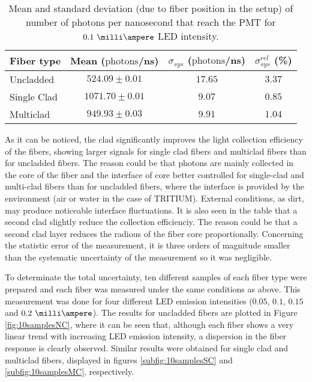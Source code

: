 \begin{table}[htbp]
\centering{}%
\begin{tabular}{lccc}
\toprule 
Fiber type & Mean ($\text{photons}$/ns) & $\sigma_{sys}$ ($\text{photons}$/ns) & $\sigma^{rel}_{sys}$ (\%) \tabularnewline
\midrule
\midrule 
Uncladded & $524.09 \pm 0.01$ & $17.65$ & $3.37$ \tabularnewline
Single Clad & $1071.70 \pm 0.01$ & $9.07$ & $0.85$ \tabularnewline
Multiclad & $949.93 \pm 0.03$ & $9.91$ & $1.04$ \tabularnewline
\bottomrule
\end{tabular}
\caption{Mean and standard deviation (due to fiber position in the setup) of number of photons per nanosecond that reach the PMT for $0.1~\milli\ampere$ LED intensity.}
\label{tab:PositionStandardDeviation}
\end{table}
As it can be noticed, the clad significantly improves the light collection efficiency of the fibers, showing larger signals for single clad fibers and multiclad fibers than for uncladded fibers. The reason could be that photons are mainly collected in the core of the fiber and the interface of core better controlled for single-clad and multi-clad fibers than for uncladded fibers, where the interface is provided by the environment (air or water in the case of TRITIUM). External conditions, as dirt, may produce noticeable interface fluctuations. It is also seen in the table that a second clad slightly reduce the collection efficienciy. The reason could be that a second clad layer reduces the radious of the fiber core proportionally. Concerning the statistic error of the measurement, it is three orders of magnitude smaller than the systematic uncertainty of the measurement so it was negligible.


To determinate the total uncertainty, ten different samples of each fiber type were prepared and each fiber was measured under the same conditions as above. This measurement was done for four different LED emission intensities ($0.05$, $0.1$, $0.15$ and $0.2~\milli\ampere$). The results for uncladded fibers are plotted in Figure \ref{fig:10samplesNC}, where it can be seen that, although each fiber shows a very linear trend with increasing LED emission intensity, a dispersion in the fiber response is clearly observed. Similar results were obtained for single clad and multiclad fibers, displayed in figures \ref{subfig:10samplesSC} and \ref{subfig:10samplesMC}, respectively.

